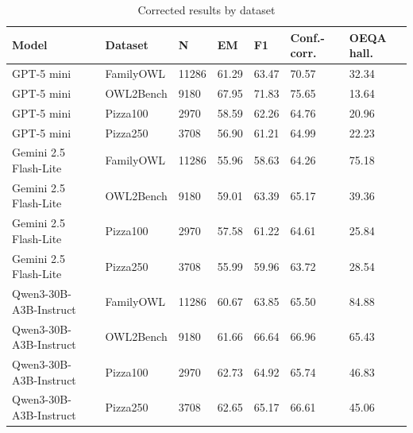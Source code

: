 \begin{table}[t]
\centering
\small
\begin{tabular}{lllllll}
\toprule
Model & Dataset & N & EM & F1 & Conf.-corr. & OEQA hall. \\
\midrule
GPT-5 mini & FamilyOWL & 11286 & 61.29 & 63.47 & 70.57 & 32.34 \\
GPT-5 mini & OWL2Bench & 9180 & 67.95 & 71.83 & 75.65 & 13.64 \\
GPT-5 mini & Pizza100 & 2970 & 58.59 & 62.26 & 64.76 & 20.96 \\
GPT-5 mini & Pizza250 & 3708 & 56.90 & 61.21 & 64.99 & 22.23 \\
Gemini 2.5 Flash-Lite & FamilyOWL & 11286 & 55.96 & 58.63 & 64.26 & 75.18 \\
Gemini 2.5 Flash-Lite & OWL2Bench & 9180 & 59.01 & 63.39 & 65.17 & 39.36 \\
Gemini 2.5 Flash-Lite & Pizza100 & 2970 & 57.58 & 61.22 & 64.61 & 25.84 \\
Gemini 2.5 Flash-Lite & Pizza250 & 3708 & 55.99 & 59.96 & 63.72 & 28.54 \\
Qwen3-30B-A3B-Instruct & FamilyOWL & 11286 & 60.67 & 63.85 & 65.50 & 84.88 \\
Qwen3-30B-A3B-Instruct & OWL2Bench & 9180 & 61.66 & 66.64 & 66.96 & 65.43 \\
Qwen3-30B-A3B-Instruct & Pizza100 & 2970 & 62.73 & 64.92 & 65.74 & 46.83 \\
Qwen3-30B-A3B-Instruct & Pizza250 & 3708 & 62.65 & 65.17 & 66.61 & 45.06 \\
\bottomrule
\end{tabular}
\caption{Corrected results by dataset}
\label{tab:core-v11-corrected-results-by-dataset}
\end{table}
